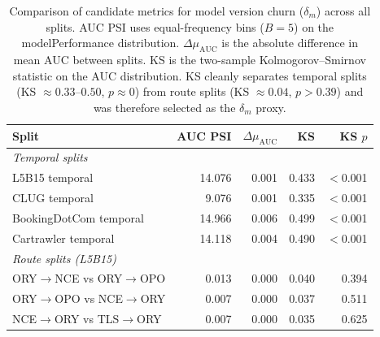 \begin{table}[ht]
\caption{Comparison of candidate metrics for model version churn ($\delta_m$) across all splits. AUC PSI uses equal-frequency bins ($B = 5$) on the modelPerformance distribution. $\Delta\mu_{\text{AUC}}$ is the absolute difference in mean AUC between splits. KS is the two-sample Kolmogorov--Smirnov statistic on the AUC distribution. KS cleanly separates temporal splits (KS $\approx 0.33$--$0.50$, $p \approx 0$) from route splits (KS $\approx 0.04$, $p > 0.39$) and was therefore selected as the $\delta_m$ proxy.}
\label{tab:metric_selection}
\centering
\begin{tabular}{lrrrr}
\toprule
Split & AUC PSI & $\Delta\mu_{\text{AUC}}$ & KS & KS $p$ \\
\midrule
\multicolumn{5}{l}{\textit{Temporal splits}} \\
L5B15 temporal & 14.076 & 0.001 & 0.433 & $<$0.001 \\
CLUG temporal & 9.076 & 0.001 & 0.335 & $<$0.001 \\
BookingDotCom temporal & 14.966 & 0.006 & 0.499 & $<$0.001 \\
Cartrawler temporal & 14.118 & 0.004 & 0.490 & $<$0.001 \\
\midrule
\multicolumn{5}{l}{\textit{Route splits (L5B15)}} \\
ORY$\to$NCE vs ORY$\to$OPO & 0.013 & 0.000 & 0.040 & 0.394 \\
ORY$\to$OPO vs NCE$\to$ORY & 0.007 & 0.000 & 0.037 & 0.511 \\
NCE$\to$ORY vs TLS$\to$ORY & 0.007 & 0.000 & 0.035 & 0.625 \\
\bottomrule
\end{tabular}
\end{table}

